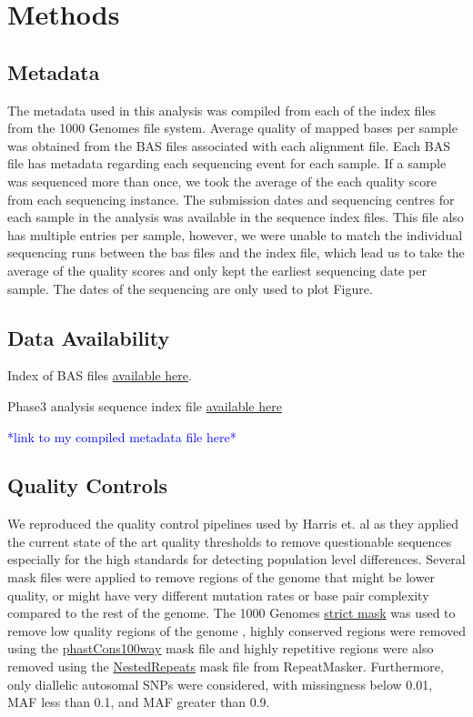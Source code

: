 \documentclass[9pt,lineno]{elife}
\newcommand{\todo}[1]{\textcolor{blue}{*#1*}}
\begin{document}
\section{Methods}
\subsection{Metadata}
The metadata used in this analysis was compiled from each of the index files from the 1000 Genomes file system. 
Average quality of mapped bases per sample was obtained from the BAS files associated with each alignment file. 
Each BAS file has metadata regarding each sequencing event for each sample. 
If a sample was sequenced more than once, we took the average of the each quality score from each sequencing instance. 
The submission dates and sequencing centres for each sample in the analysis was available in the sequence index files.  
This file also has multiple entries per sample, however, we were unable to match the individual sequencing runs between the bas files and the index file, which lead us to take the average of the quality scores and only kept the earliest sequencing date per sample. 
The dates of the sequencing are only used to plot Figure.

\subsection{Data Availability}

Index of BAS files \href{http://ftp.1000genomes.ebi.ac.uk/vol1/ftp/data_collections/1000_genomes_project/1000genomes.low_coverage.GRCh38DH.alignment.index}{available here}.

Phase3 analysis sequence index file  \href{http://ftp.1000genomes.ebi.ac.uk/vol1/ftp/phase3/20130502.phase3.analysis.sequence.index}{available here} 

\todo{link to my compiled metadata file here}

\subsection{Quality Controls}
We reproduced the quality control pipelines used by Harris et. al as they applied the current state of the art quality thresholds to remove questionable sequences especially for the high standards for detecting population level differences. 
Several mask files were applied to remove regions of the genome that might be lower quality, or might have very different mutation rates or base pair complexity compared to the rest of the genome. 
The  1000 Genomes \href{http://ftp.1000genomes.ebi.ac.uk/vol1/ftp/release/20130502/supporting/accessible_genome_masks/20141020.strict_mask.whole_genome.bed}{strict mask} was used to remove low quality regions of the genome , highly conserved regions were removed using the \href{http://hgdownload.cse.ucsc.edu/goldenPath/hg19/database/phastConsElements100way.txt.gz}{phastCons100way} mask file and highly repetitive regions were also removed using the \href{http://hgdownload.cse.ucsc.edu/goldenpath/hg19/database/nestedRepeats.txt.gz}{NestedRepeats} mask file from RepeatMasker. 
Furthermore, only diallelic autosomal SNPs were considered, with missingness below 0.01, MAF less than 0.1, and MAF greater than 0.9.
\end{document}
